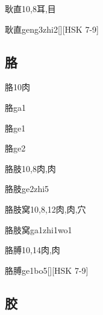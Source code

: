 \begin{Entry}{耿直}{10,8}{⽿,⽬}
  \begin{Phonetics}{耿直}{geng3zhi2}[][HSK 7-9]
  \end{Phonetics}
\end{Entry}

\subsection*{胳}

\begin{Entry}{胳}{10}{⾁}
  \begin{Phonetics}{胳}{ga1}
  \end{Phonetics}
  \begin{Phonetics}{胳}{ge1}
  \end{Phonetics}
  \begin{Phonetics}{胳}{ge2}
  \end{Phonetics}
\end{Entry}

\begin{Entry}{胳肢}{10,8}{⾁,⾁}
  \begin{Phonetics}{胳肢}{ge2zhi5}
  \end{Phonetics}
\end{Entry}

\begin{Entry}{胳肢窝}{10,8,12}{⾁,⾁,⽳}
  \begin{Phonetics}{胳肢窝}{ga1zhi1wo1}
  \end{Phonetics}
\end{Entry}

\begin{Entry}{胳膊}{10,14}{⾁,⾁}
  \begin{Phonetics}{胳膊}{ge1bo5}[][HSK 7-9]
  \end{Phonetics}
\end{Entry}

\subsection*{胶}

